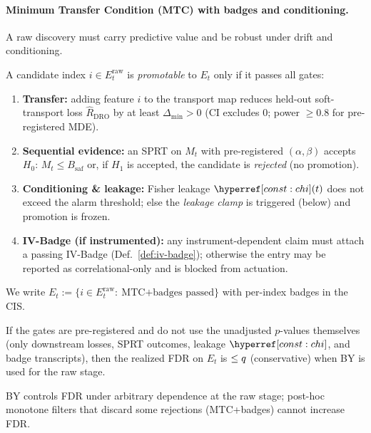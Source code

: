 \paragraph{Minimum Transfer Condition (MTC) with badges and conditioning.}
A raw discovery must carry predictive value and be robust under drift and conditioning.

\begin{definition}\label{def:mtc}
\emph{}
A candidate index $i\in E_t^{\mathrm{raw}}$ is \emph{promotable} to $E_t$ only if it passes all gates:
\begin{enumerate}[leftmargin=*,itemsep=2pt]
\item \textbf{Transfer:} adding feature $i$ to the transport map reduces held-out soft-transport loss $\hat R_{\mathrm{DRO}}$ by at least $\Delta_{\min}>0$ (CI excludes $0$; power $\ge 0.8$ for pre-registered MDE).
\item \textbf{Sequential evidence:} an SPRT on $M_t$ with pre-registered $(\alpha,\beta)$ accepts $H_0:\,M_t\le B_{\mathrm{saf}}$ or, if $H_1$ is accepted, the candidate is \emph{rejected} (no promotion).
\item \textbf{Conditioning \& leakage:} Fisher leakage $\constref{chi}(t)$ does not exceed the alarm threshold; else the \emph{leakage clamp} is triggered (below) and promotion is frozen.
\item \textbf{IV-Badge (if instrumented):} any instrument-dependent claim must attach a passing \textsf{IV-Badge} (Def.~\ref{def:iv-badge}); otherwise the entry may be reported as correlational-only and is blocked from actuation.
\end{enumerate}
We write $E_t:=\{i\in E_t^{\mathrm{raw}}:\ \text{MTC+badges passed}\}$ with per-index badges in the CIS.
\end{definition}

\begin{proposition}\label{prop:fdr-mtc}
\emph{}
If the gates are pre-registered and do not use the unadjusted $p$-values themselves (only downstream losses, SPRT outcomes, leakage $\constref{chi}$, and badge transcripts), then the realized FDR on $E_t$ is $\le q$ (conservative) when BY is used for the raw stage.
\begin{proofsketch}
BY controls FDR under arbitrary dependence at the raw stage; post-hoc monotone filters that discard some rejections (MTC+badges) cannot increase FDR.
\end{proofsketch}
\end{proposition}

